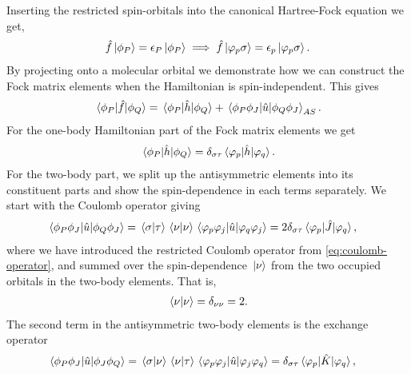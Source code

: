             Inserting the restricted spin-orbitals into the canonical
            Hartree-Fock equation we get,
            \begin{align}
                \hat{f}\ket*{\phi_P} = \epsilon_P\ket*{\phi_P}
                \implies
                \hat{f}\ket*{\varphi_p\sigma}
                = \epsilon_{p}\ket*{\varphi_p\sigma}.
            \end{align}
            By projecting onto a molecular orbital we demonstrate how we can
            construct the Fock matrix elements when the Hamiltonian is
            spin-independent.
            This gives
            \begin{align}
                \mel*{\phi_P}{\hat{f}}{\phi_Q}
                = \mel*{\phi_P}{\hat{h}}{\phi_Q}
                + \mel*{\phi_P\phi_J}{\hat{u}}{\phi_Q\phi_J}_{AS}.
                \label{eq:mo-fock-elements}
            \end{align}
            For the one-body Hamiltonian part of the Fock matrix elements we get
            \begin{align}
                \mel*{\phi_P}{\hat{h}}{\phi_Q}
                = \delta_{\sigma\tau}\mel*{\varphi_p}{\hat{h}}{\varphi_q}.
            \end{align}
            For the two-body part, we split up the antisymmetric elements into
            its constituent parts and show the spin-dependence in each terms
            separately.
            We start with the Coulomb operator giving
            \begin{align}
                \mel*{\phi_P\phi_J}{\hat{u}}{\phi_Q\phi_J}
                &= \braket*{\sigma}{\tau}\braket*{\nu}{\nu}
                \mel*{\varphi_p\varphi_j}{\hat{u}}{\varphi_q\varphi_j}
                = 2 \delta_{\sigma\tau}
                \mel*{\varphi_p}{\hat{J}}{\varphi_q},
            \end{align}
            where we have introduced the restricted Coulomb operator from
            \autoref{eq:coulomb-operator}, and summed over the spin-dependence
            $\ket*{\nu}$ from the two occupied orbitals in the two-body elements.
            That is,
            \begin{align}
                \braket*{\nu}{\nu} = \delta_{\nu\nu} = 2.
            \end{align}
            The second term in the antisymmetric two-body elements is the
            exchange operator
            \begin{align}
                \mel*{\phi_P\phi_J}{\hat{u}}{\phi_J\phi_Q}
                &= \braket*{\sigma}{\nu}\braket*{\nu}{\tau}
                \mel*{\varphi_p\varphi_j}{\hat{u}}{\varphi_j\varphi_q}
                = \delta_{\sigma\tau}
                \mel*{\varphi_p}{\hat{K}}{\varphi_q},
            \end{align}
